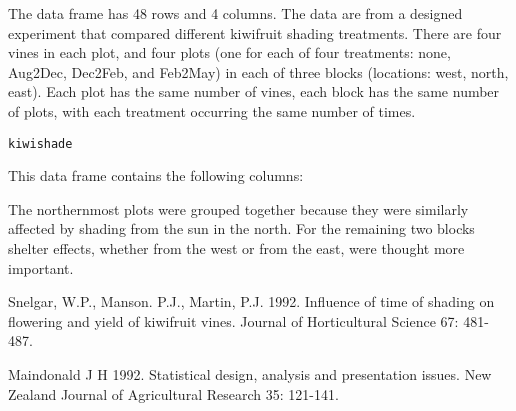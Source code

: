 \begin{Description}\relax
The  data frame has 48 rows and 4 columns.
The data are from a designed experiment that  
compared different kiwifruit shading treatments.
There are four vines in each plot, and four plots (one for each of four 
treatments: none, Aug2Dec, Dec2Feb, and Feb2May) in each of three blocks
(locations: west, north, east). Each 
plot has the same number of vines, each block has the same number of 
plots, with each treatment occurring the same number of times.
\end{Description}
\begin{Usage}
\begin{verbatim}kiwishade\end{verbatim}
\end{Usage}
\begin{Format}\relax
This data frame contains the following columns:
\end{Format}
\begin{Details}\relax
The northernmost plots were grouped together because they
were similarly affected by shading from the sun in the north.
For the remaining two blocks shelter effects, whether from the
west or from the east, were thought more important.
\end{Details}
\begin{Source}\relax
Snelgar, W.P., Manson. P.J., Martin, P.J. 1992. Influence of
time of shading on flowering and yield of kiwifruit vines. Journal of
Horticultural Science 67: 481-487.
\end{Source}
\begin{References}\relax
Maindonald J H 1992. Statistical design, analysis and presentation
issues. New Zealand Journal of Agricultural Research 35: 121-141.
\end{References}
